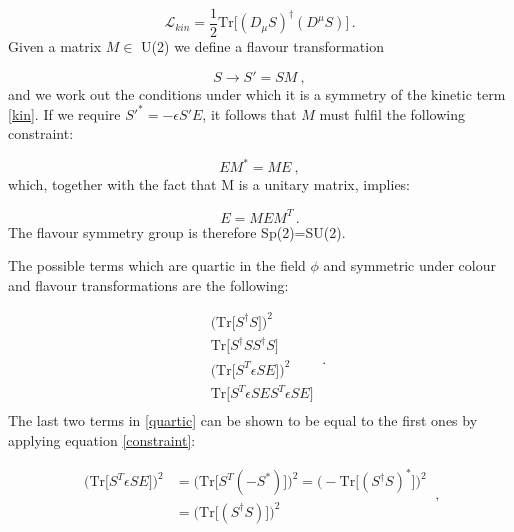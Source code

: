 \begin{equation}
\mathcal{L}_{kin} = \frac{1}{2} \mathrm{Tr} \bigl[ (D_{\mu}S)^{\dagger} (D^{\mu}S) \bigr] \, .
\label{kin}
\end{equation}
%
Given a matrix $M \in$ U(2) we define a flavour transformation

\begin{equation}
S \to S' = SM \: ,
\end{equation}
%
and we work out the conditions under which it is a symmetry of the kinetic term \ref{kin}. If we require $S'^* = - \epsilon S' E$, it follows that $M$ must fulfil the following constraint:

\begin{equation}
EM^* = ME \: ,
\end{equation}
%
which, together with the fact that M is a unitary matrix, implies:

\begin{equation}
E=MEM^T \, .
\end{equation}
%
The flavour symmetry group is therefore Sp(2)=SU(2).

The possible terms which are quartic in the field $\phi$ and symmetric under colour and flavour transformations are the following:

\begin{equation}
\begin{split}
& \bigl( \mathrm{Tr} \bigl[ S^{\dagger} S \bigr] \bigr)^2 \\
& \mathrm{Tr} \bigl[ S^{\dagger} S S^{\dagger} S\bigr] \\
&  \bigl( \mathrm{Tr} \bigl[ S^T \epsilon S E \bigr] \bigr)^2 \\
& \mathrm{Tr} \bigl[ S^T \epsilon S E S^T \epsilon S E\bigr] \\
\end{split} \: .
\label{quartic}
\end{equation}
%
The last two terms in \ref{quartic} can be shown to be equal to the first ones by applying equation \ref{constraint}:
 
\begin{equation}
\begin{split}
\bigl( \mathrm{Tr} \bigl[ S^T \epsilon S E \bigr] \bigr)^2  &=   \bigl( \mathrm{Tr} \bigl[ S^T (-S^*) \bigr] \bigr)^2 =  \bigl( - \mathrm{Tr} \bigl[ (S^{\dagger} S)^* \bigr] \bigr)^2 \\
 & = \bigl(  \mathrm{Tr} \bigl[ (S^{\dagger} S) \bigr] \bigr)^2 
 \end{split} \: ,
 \label{proof1}
\end{equation}

